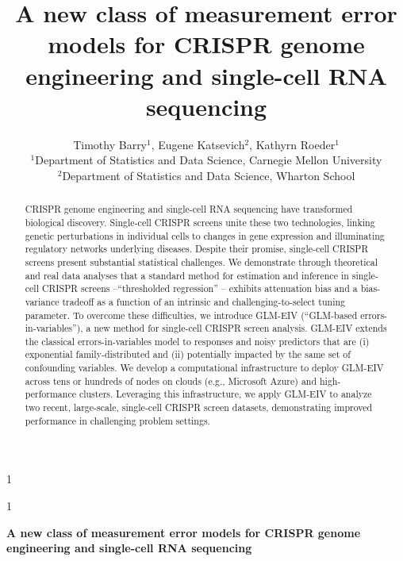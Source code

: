 \documentclass[12pt]{article}
\date{\vspace{-5ex}}
\newcommand{\blind}{1}
\begin{document}
\def\spacingset#1{\renewcommand{\baselinestretch}%
{#1}\small\normalsize} \spacingset{1}
\blind
{
  \title{\bf A new class of measurement error models for CRISPR genome engineering and single-cell RNA sequencing}
  \author{Timothy Barry$^1$, Eugene Katsevich$^2$, Kathyrn Roeder$^1$ \\
    $^1$Department of Statistics and Data Science, Carnegie Mellon University \\
    $^2$Department of Statistics and Data Science, Wharton School}
  \maketitle
} \fi

\blind
{
  \bigskip
  \bigskip
  \bigskip
  \begin{center}
    {\LARGE \bf A new class of measurement error models for CRISPR genome engineering and single-cell RNA sequencing}
\end{center}
  \medskip
} \fi

\bigskip
\begin{abstract}
CRISPR genome engineering and single-cell RNA sequencing have transformed biological discovery. Single-cell CRISPR screens unite these two technologies, linking genetic perturbations in individual cells to changes in gene expression and illuminating regulatory networks underlying diseases. Despite their promise, single-cell CRISPR screens present substantial statistical challenges. We demonstrate through theoretical and real data analyses that a standard method for estimation and inference in single-cell CRISPR screens --``thresholded regression'' -- exhibits attenuation bias and a bias-variance tradeoff as a function of an intrinsic and challenging-to-select tuning parameter. To overcome these difficulties, we introduce GLM-EIV (``GLM-based errors-in-variables''), a new method for single-cell CRISPR screen analysis. GLM-EIV extends the classical errors-in-variables model to responses and noisy predictors that are (i) exponential family-distributed and (ii) potentially impacted by the same set of confounding variables. We develop a computational infrastructure to deploy GLM-EIV across tens or hundreds of nodes on clouds (e.g., Microsoft Azure) and high-performance clusters. Leveraging this infrastructure, we apply GLM-EIV to analyze two recent, large-scale, single-cell CRISPR screen datasets, demonstrating improved performance in challenging problem settings.
\end{abstract}
\end{document}
